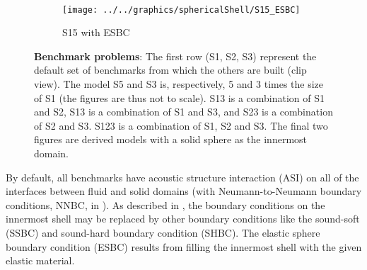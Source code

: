 \begin{figure}
\begin{subfigure}{0.3\textwidth}
		\label{Fig1:S12_ASI_3NN}
    \end{subfigure}
	~
	\begin{subfigure}{0.3\textwidth}
		\centering
		\texttt{[image: ../../graphics/sphericalShell/S15\_ESBC]}
		\caption{S15 with ESBC}
		\label{Fig1:S23_ASI_3NN}
    \end{subfigure}
    \caption{\textbf{Benchmark problems}: The first row (S1, S2, S3) represent the default set of benchmarks from which the others are built (clip view). The model S5 and S3 is, respectively, 5 and 3 times the size of S1 (the figures are thus not to scale). S13 is a combination of S1 and S2, S13 is a combination of S1 and S3, and S23 is a combination of S2 and S3. S123 is a combination of S1, S2 and S3. The final two figures are derived models with a solid sphere as the innermost domain.}
	\label{Fig1:BenchmarksProblems}
\end{figure}

By default, all benchmarks have acoustic structure interaction (ASI) on all of the interfaces between fluid and solid domains (with Neumann-to-Neumann boundary conditions, NNBC, in ). As described in , the boundary conditions on the innermost shell may be replaced by other boundary conditions like the sound-soft (SSBC) and sound-hard boundary condition (SHBC). The elastic sphere boundary condition (ESBC) results from filling the innermost shell with the given elastic material. 

